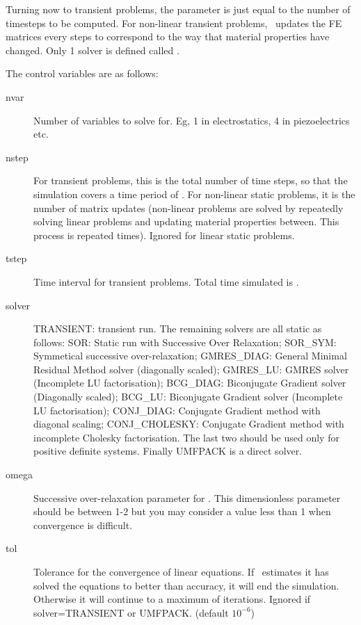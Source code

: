 \documentclass[a4paper,twoside,11pt]{book}
\begin{document}
Turning now to transient problems, the parameter  is just
equal to the number of timesteps to be computed. For non-linear transient
problems, \zinc\ updates the FE matrices every  steps
to correspond to the way that material properties have changed. Only 1
solver is defined called .

The control variables are as follows:
\begin{description}
\item[nvar] Number of variables to solve for. Eg, 1 in electrostatics,
  4 in piezoelectrics etc.


\item[nstep] For transient problems, this is the total number of time
  steps, so that the simulation covers a time period of
  . For non-linear static problems, it is the number
  of matrix updates (non-linear problems are solved by repeatedly
  solving linear problems and updating material properties
  between. This process is repeated  times). Ignored for
  linear static problems.

\item[tstep] Time interval for transient problems. Total time
  simulated is .

\item[solver] TRANSIENT: transient run. The remaining solvers are all
  static as follows: SOR: Static run with Successive Over Relaxation;
  SOR\_SYM: Symmetical successive over-relaxation; GMRES\_DIAG:
  General Minimal Residual Method solver (diagonally scaled);
  GMRES\_LU: GMRES solver (Incomplete LU factorisation); BCG\_DIAG:
  Biconjugate Gradient solver (Diagonally scaled); BCG\_LU:
  Biconjugate Gradient solver (Incomplete LU factorisation);
  CONJ\_DIAG: Conjugate Gradient method with diagonal scaling;
  CONJ\_CHOLESKY: Conjugate Gradient method with incomplete Cholesky
  factorisation. The last two should be used only for positive
  definite systems. Finally UMFPACK is a direct solver.

\item[omega] Successive over-relaxation parameter for
  . This dimensionless parameter should be
  between 1-2 but you may consider a value less than 1 when
  convergence is difficult.

\item[tol] Tolerance for the convergence of linear equations. If \zinc\ estimates it
  has solved the equations to better than  accuracy, it will
  end the simulation. Otherwise it will continue to a maximum of
   iterations. Ignored if solver=TRANSIENT or UMFPACK. (default $10^{-6}$)


\end{description}
\end{document}
